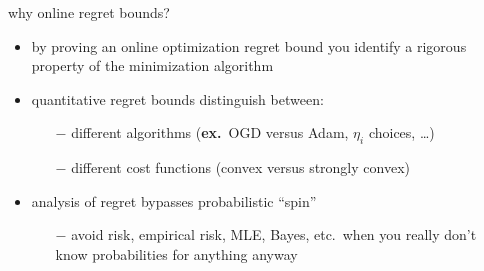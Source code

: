 \documentclass[xcolor={svgnames},
               hyperref={colorlinks,citecolor=DeepPink4,linkcolor=FireBrick,urlcolor=Maroon}]
               {beamer}
\begin{document}
\begin{frame}{why online regret bounds?}

\begin{itemize}
\item by proving an online optimization regret bound you identify a rigorous property of the minimization algorithm
\item quantitative regret bounds distinguish between:
    \begin{itemize}
    \item[$-$] different algorithms (\textbf{ex.}~OGD versus Adam, $\eta_i$ choices, \dots)
    \item[$-$] different cost functions (convex versus strongly convex)
    \end{itemize}
\item analysis of regret bypasses probabilistic ``spin''
    \begin{itemize}
    \item[$-$] avoid risk, empirical risk, MLE, Bayes, etc.~when you really don't know probabilities for anything anyway
    \end{itemize}
\end{itemize}
\end{frame}
\end{document}
